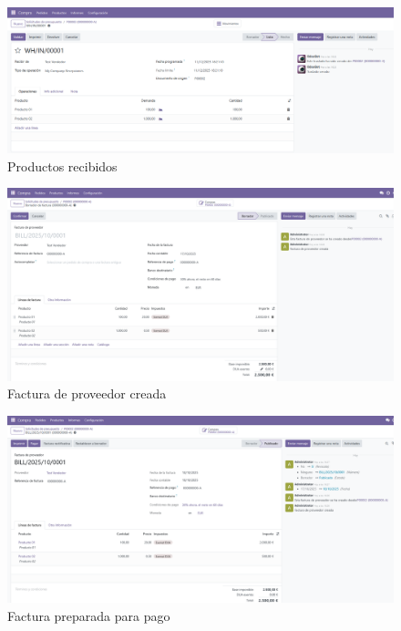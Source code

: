 \documentclass[a4paper,12pt]{article}
\begin{document}
\begin{figure}[h!]
    \centering
    \includegraphics[width=1\textwidth]{pr2odoo31-productosRecibidos.png}
    \caption{Productos recibidos}
\end{figure}
\FloatBarrier

\begin{figure}[h!]
    \centering
    \includegraphics[width=1\textwidth]{pr2odoo32-facturaProveedorCreada.png}
    \caption{Factura de proveedor creada}
\end{figure}
\FloatBarrier

\begin{figure}[h!]
    \centering
    \includegraphics[width=1\textwidth]{pr2odoo33-preparadaParaPago.png}
    \caption{Factura preparada para pago}
\end{figure}
\FloatBarrier
\end{document}
